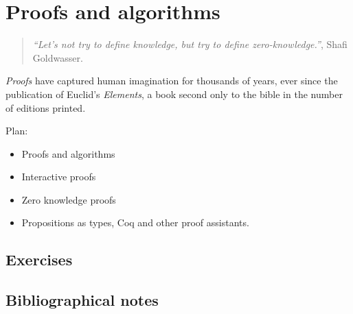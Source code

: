 \chapter{Proofs and algorithms}\label{chapproofs}

\begin{quote}
\emph{``Let's not try to define knowledge, but try to define
zero-knowledge.''}, Shafi Goldwasser.
\end{quote}

\emph{Proofs} have captured human imagination for thousands of years,
ever since the publication of Euclid's \emph{Elements}, a book second
only to the bible in the number of editions printed.

Plan:

\begin{itemize}
\item
  Proofs and algorithms
\item
  Interactive proofs
\item
  Zero knowledge proofs
\item
  Propositions as types, Coq and other proof assistants.
\end{itemize}

\section{Exercises}\label{Exercises}

\section{Bibliographical notes}\label{Bibliographical-notes}
